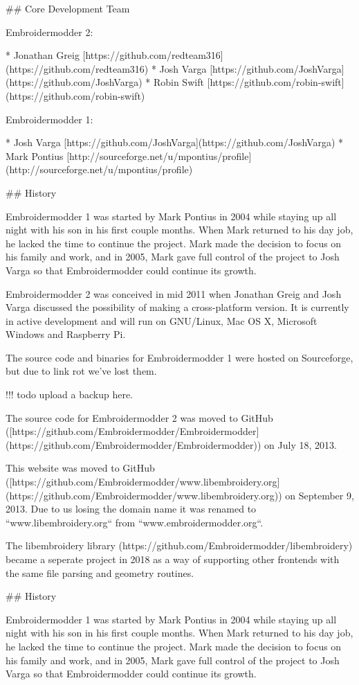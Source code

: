 ## Core Development Team

Embroidermodder 2:

  * Jonathan Greig [https://github.com/redteam316](https://github.com/redteam316)
  * Josh Varga [https://github.com/JoshVarga](https://github.com/JoshVarga)
  * Robin Swift [https://github.com/robin-swift](https://github.com/robin-swift)

Embroidermodder 1:

  * Josh Varga [https://github.com/JoshVarga](https://github.com/JoshVarga)
  * Mark Pontius [http://sourceforge.net/u/mpontius/profile](http://sourceforge.net/u/mpontius/profile)

## History

Embroidermodder 1 was started by Mark Pontius in 2004 while staying up all night
with his son in his first couple months. When Mark returned to his day job,
he lacked the time to continue the project. Mark made the decision to focus on his
family and work, and in 2005, Mark gave full control of the project to Josh Varga
so that Embroidermodder could continue its growth.

Embroidermodder 2 was conceived in mid 2011 when Jonathan Greig and Josh Varga
discussed the possibility of making a cross-platform version. It is currently in
active development and will run on GNU/Linux, Mac OS X, Microsoft Windows and Raspberry Pi.

The source code and binaries for Embroidermodder 1 were hosted on Sourceforge, but
due to link rot we've lost them.

!!! todo
    upload a backup here.

The source code for Embroidermodder
2 was moved to GitHub ([https://github.com/Embroidermodder/Embroidermodder](https://github.com/Embroidermodder/Embroidermodder)) on July 18, 2013.

This website was moved to
GitHub ([https://github.com/Embroidermodder/www.libembroidery.org](https://github.com/Embroidermodder/www.libembroidery.org)) on September 9, 2013. Due to us losing the domain name it was renamed to
``www.libembroidery.org`` from ``www.embroidermodder.org``.

The libembroidery library (https://github.com/Embroidermodder/libembroidery)
became a seperate project in 2018 as a way of supporting other frontends with the
same file parsing and geometry routines.

## History

Embroidermodder 1 was started by Mark Pontius in 2004 while staying up all night
with his son in his first couple months. When Mark returned to his day job, he
lacked the time to continue the project. Mark made the decision to focus on his
family and work, and in 2005, Mark gave full control of the project to Josh Varga
so that Embroidermodder could continue its growth.

